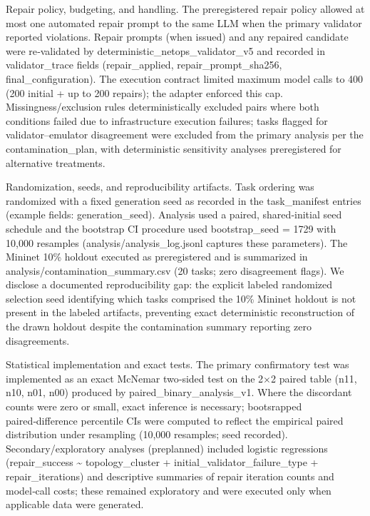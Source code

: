 \documentclass[conference]{IEEEtran}
\begin{document}
Repair policy, budgeting, and handling. The preregistered repair policy allowed at most one automated repair prompt to the same LLM when the primary validator reported violations. Repair prompts (when issued) and any repaired candidate were re‑validated by deterministic\_netops\_validator\_v5 and recorded in validator\_trace fields (repair\_applied, repair\_prompt\_sha256, final\_configuration). The execution contract limited maximum model calls to 400 (200 initial + up to 200 repairs); the adapter enforced this cap. Missingness/exclusion rules deterministically excluded pairs where both conditions failed due to infrastructure execution failures; tasks flagged for validator--emulator disagreement were excluded from the primary analysis per the contamination\_plan, with deterministic sensitivity analyses preregistered for alternative treatments.

Randomization, seeds, and reproducibility artifacts. Task ordering was randomized with a fixed generation seed as recorded in the task\_manifest entries (example fields: generation\_seed). Analysis used a paired, shared‑initial seed schedule and the bootstrap CI procedure used bootstrap\_seed = 1729 with 10,000 resamples (analysis/analysis\_log.jsonl captures these parameters). The Mininet 10\% holdout executed as preregistered and is summarized in analysis/contamination\_summary.csv (20 tasks; zero disagreement flags). We disclose a documented reproducibility gap: the explicit labeled randomized selection seed identifying which tasks comprised the 10\% Mininet holdout is not present in the labeled artifacts, preventing exact deterministic reconstruction of the drawn holdout despite the contamination summary reporting zero disagreements.

Statistical implementation and exact tests. The primary confirmatory test was implemented as an exact McNemar two‑sided test on the 2\ensuremath{\times}2 paired table (n11, n10, n01, n00) produced by paired\_binary\_analysis\_v1. Where the discordant counts were zero or small, exact inference is necessary; bootsrapped paired‑difference percentile CIs were computed to reflect the empirical paired distribution under resampling (10,000 resamples; seed recorded). Secondary/exploratory analyses (preplanned) included logistic regressions (repair\_success \textasciitilde{} topology\_cluster + initial\_validator\_failure\_type + repair\_iterations) and descriptive summaries of repair iteration counts and model‑call costs; these remained exploratory and were executed only when applicable data were generated.
\end{document}
